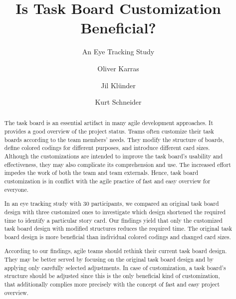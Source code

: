 \documentclass{llncs}
\begin{document}
\title{Is Task Board Customization Beneficial?}

\subtitle{An Eye Tracking Study}


\author{Oliver Karras \Letter \and Jil Kl\"under \and Kurt Schneider}




\maketitle

\begin{abstract}
The task board is an essential artifact in many agile development approaches. 
It provides a good overview of the project status. Teams often customize their 
task boards according to the team members' needs. They modify the structure 
of boards, define colored codings for different purposes, and introduce 
different card sizes. Although the customizations are intended to improve the 
task board's usability and effectiveness, they may also complicate its 
comprehension and use. The increased effort impedes the work of both the team 
and team externals. Hence, task board customization is in conflict with the 
agile practice of fast and easy overview for everyone.

In an eye tracking study with 30 participants, we compared an original task 
board design with three customized ones to investigate which design shortened 
the required time to identify a particular story card. Our findings yield that 
only the customized task board design with modified structures reduces the 
required time. The original task board design is more beneficial than 
individual colored codings and changed card sizes.

According to our findings, agile teams should rethink their current task board 
design. They may be better served by focusing on the original task board design 
and by applying only carefully selected adjustments. In case of customization, 
a task board's structure should be adjusted since this is the only beneficial 
kind of customization, that additionally complies more precisely with the 
concept of fast and easy project overview.

\end{abstract}
\end{document}
